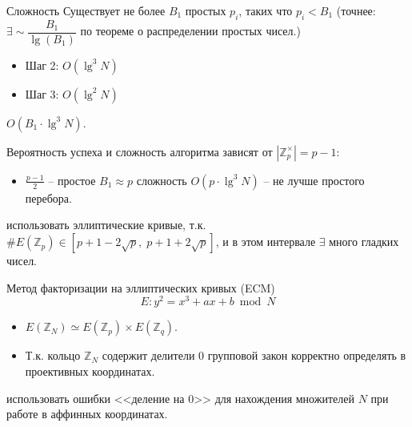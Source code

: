 \documentclass{beamer}
\begin{document}
\begin{frame}{Сложность}
Существует не более $B_1$ простых $p_i$, таких что $p_i < B_1$ (точнее: $\exists \sim \dfrac{B_1}{\lg ( B_1 )}$ по теореме о распределении простых чисел.)
\begin{itemize}
    \item Шаг 2: $O( \lg^3 N )$
    \item Шаг 3: $O( \lg^2 N )$
\end{itemize}
 $O( B_1 \cdot \lg^3 N)$.
\end{frame}

\begin{frame}
 Вероятность успеха и сложность алгоритма зависят от $|\mathbb{Z}_p^\times| = p - 1:$ \\
\begin{itemize}
    \item $\frac{p - 1}{2}$ -- простое \structure{$\Rightarrow$} $ {B_1} \approx p$ \structure{$\Rightarrow$} сложность $O( p \cdot \lg^3 N )$ -- не лучше простого перебора.
\end{itemize}

\vspace{1em}

 использовать эллиптические кривые, т.к.  $\# E( \mathbb{Z}_p ) \in [ p + 1 - 2\sqrt p ,\;p + 1 + 2\sqrt p ]$, и в этом интервале $\exists$ много гладких чисел. 
\end{frame}

\begin{frame}{Метод факторизации на эллиптических кривых (ECM)}
\[E: y^2 = x^3 + a x + b \bmod N\]
\begin{itemize}
    \item $E(\mathbb{Z}_N) \simeq E(\mathbb{Z}_p) \times E(\mathbb{Z}_q)$.
    \item Т.к. кольцо $\mathbb{Z}_N$ содержит делители $0$ групповой закон корректно определять в проективных координатах.
\end{itemize}
\vspace{1em}
 использовать ошибки <<деление на $0$>> для нахождения множителей $N$ при работе в аффинных координатах.
\end{frame}
\end{document}
